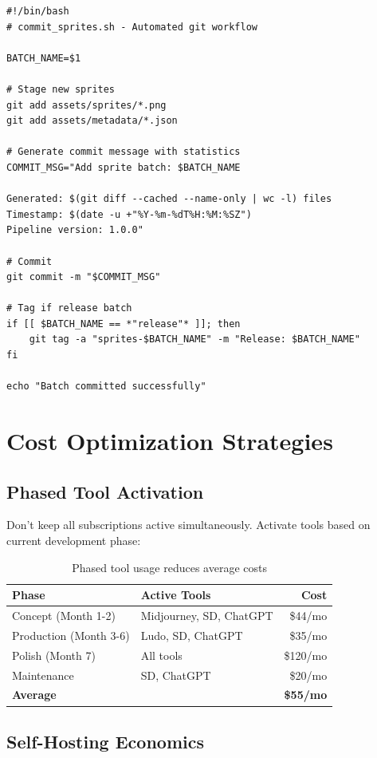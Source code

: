 \documentclass[11pt]{article}
\begin{document}
\begin{verbatim}
#!/bin/bash
# commit_sprites.sh - Automated git workflow

BATCH_NAME=$1

# Stage new sprites
git add assets/sprites/*.png
git add assets/metadata/*.json

# Generate commit message with statistics
COMMIT_MSG="Add sprite batch: $BATCH_NAME

Generated: $(git diff --cached --name-only | wc -l) files
Timestamp: $(date -u +"%Y-%m-%dT%H:%M:%SZ")
Pipeline version: 1.0.0"

# Commit
git commit -m "$COMMIT_MSG"

# Tag if release batch
if [[ $BATCH_NAME == *"release"* ]]; then
    git tag -a "sprites-$BATCH_NAME" -m "Release: $BATCH_NAME"
fi

echo "Batch committed successfully"
\end{verbatim}

\section{Cost Optimization Strategies}

\subsection{Phased Tool Activation}

Don't keep all subscriptions active simultaneously. Activate tools based on current development phase:

\begin{table}[H]
\centering
\begin{tabular}{lp{7cm}r}
\toprule
\textbf{Phase} & \textbf{Active Tools} & \textbf{Cost} \\
\midrule
Concept (Month 1-2) & Midjourney, SD, ChatGPT & \$44/mo \\
Production (Month 3-6) & Ludo, SD, ChatGPT & \$35/mo \\
Polish (Month 7) & All tools & \$120/mo \\
Maintenance & SD, ChatGPT & \$20/mo \\
\midrule
\textbf{Average} & & \textbf{\$55/mo} \\
\bottomrule
\end{tabular}
\caption{Phased tool usage reduces average costs}
\end{table}

\subsection{Self-Hosting Economics}
\end{document}

